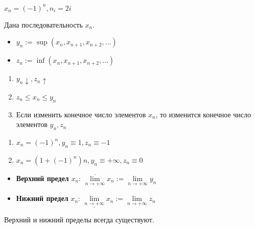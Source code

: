 \begin{example}
    $x_n=(-1)^n, n_i=2i$
\end{example}

\begin{definition}
    Дана последовательность $x_n$.
    \begin{itemize}
        \item $y_n:=\sup(x_n, x_{n+1}, x_{n+2},\ldots)$
        \item $z_n:=\inf(x_n, x_{n+1}, x_{n+2},\ldots)$
    \end{itemize}
\end{definition}

\begin{remark}
    \begin{enumerate}
        \item $y_n\downarrow, z_n\uparrow$
        \item $z_n\le x_n\le y_n$
        \item Если изменить конечное число элементов $x_n$, то изменится конечное число элементов $y_n, z_n$
    \end{enumerate}
\end{remark}

\begin{example}
    \begin{enumerate}
        \item $x_n=(-1)^n, y_n\equiv1, z_n\equiv-1$
        \item $x_n=(1+(-1)^n)n, y_n\equiv+\infty, z_n\equiv0$
    \end{enumerate}
\end{example}

    \begin{itemize}
        \item \textbf{Верхний предел} $x_n$: $\overline{\lim\limits_{n\to+\infty}} x_n := \lim\limits_{n\to+\infty}y_n$
        \item \textbf{Нижний предел} $x_n$: $\underline{\lim\limits_{n\to+\infty}} x_n := \lim\limits_{n\to+\infty}z_n$
    \end{itemize}
    Верхний и нижний пределы всегда существуют.

